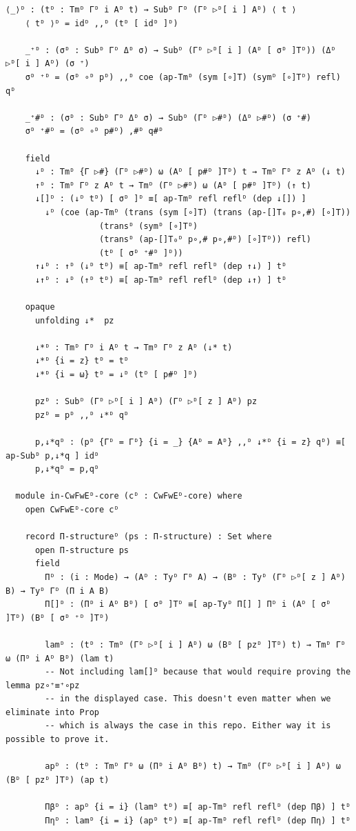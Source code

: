 {\begin{Verbatim}[breaklines=true,breakanywhere=true,fontsize=\scriptsize]
    ⟨_⟩ᴰ : (tᴰ : Tmᴰ Γᴰ i Aᴰ t) → Subᴰ Γᴰ (Γᴰ ▷ᴰ[ i ] Aᴰ) ⟨ t ⟩
    ⟨ tᴰ ⟩ᴰ = idᴰ ,,ᴰ (tᴰ [ idᴰ ]ᴰ)

    _⁺ᴰ : (σᴰ : Subᴰ Γᴰ Δᴰ σ) → Subᴰ (Γᴰ ▷ᴰ[ i ] (Aᴰ [ σᴰ ]Tᴰ)) (Δᴰ ▷ᴰ[ i ] Aᴰ) (σ ⁺)
    σᴰ ⁺ᴰ = (σᴰ ∘ᴰ pᴰ) ,,ᴰ coe (ap-Tmᴰ (sym [∘]T) (symᴰ [∘]Tᴰ) refl) qᴰ

    _⁺#ᴰ : (σᴰ : Subᴰ Γᴰ Δᴰ σ) → Subᴰ (Γᴰ ▷#ᴰ) (Δᴰ ▷#ᴰ) (σ ⁺#)
    σᴰ ⁺#ᴰ = (σᴰ ∘ᴰ p#ᴰ) ,#ᴰ q#ᴰ

    field
      ↓ᴰ : Tmᴰ {Γ ▷#} (Γᴰ ▷#ᴰ) ω (Aᴰ [ p#ᴰ ]Tᴰ) t → Tmᴰ Γᴰ z Aᴰ (↓ t)
      ↑ᴰ : Tmᴰ Γᴰ z Aᴰ t → Tmᴰ (Γᴰ ▷#ᴰ) ω (Aᴰ [ p#ᴰ ]Tᴰ) (↑ t)
      ↓[]ᴰ : (↓ᴰ tᴰ) [ σᴰ ]ᴰ ≡[ ap-Tmᴰ refl reflᴰ (dep ↓[]) ]
        ↓ᴰ (coe (ap-Tmᴰ (trans (sym [∘]T) (trans (ap-[]T₀ p∘,#) [∘]T))
                   (transᴰ (symᴰ [∘]Tᴰ)
                   (transᴰ (ap-[]T₀ᴰ p∘,# p∘,#ᴰ) [∘]Tᴰ)) refl)
                   (tᴰ [ σᴰ ⁺#ᴰ ]ᴰ))
      ↑↓ᴰ : ↑ᴰ (↓ᴰ tᴰ) ≡[ ap-Tmᴰ refl reflᴰ (dep ↑↓) ] tᴰ
      ↓↑ᴰ : ↓ᴰ (↑ᴰ tᴰ) ≡[ ap-Tmᴰ refl reflᴰ (dep ↓↑) ] tᴰ

    opaque
      unfolding ↓*  pz

      ↓*ᴰ : Tmᴰ Γᴰ i Aᴰ t → Tmᴰ Γᴰ z Aᴰ (↓* t)
      ↓*ᴰ {i = z} tᴰ = tᴰ
      ↓*ᴰ {i = ω} tᴰ = ↓ᴰ (tᴰ [ p#ᴰ ]ᴰ)

      pzᴰ : Subᴰ (Γᴰ ▷ᴰ[ i ] Aᴰ) (Γᴰ ▷ᴰ[ z ] Aᴰ) pz
      pzᴰ = pᴰ ,,ᴰ ↓*ᴰ qᴰ

      p,↓*qᴰ : (pᴰ {Γᴰ = Γᴰ} {i = _} {Aᴰ = Aᴰ} ,,ᴰ ↓*ᴰ {i = z} qᴰ) ≡[ ap-Subᴰ p,↓*q ] idᴰ
      p,↓*qᴰ = p,qᴰ

  module in-CwFwEᴰ-core (cᴰ : CwFwEᴰ-core) where
    open CwFwEᴰ-core cᴰ

    record Π-structureᴰ (ps : Π-structure) : Set where
      open Π-structure ps
      field
        Πᴰ : (i : Mode) → (Aᴰ : Tyᴰ Γᴰ A) → (Bᴰ : Tyᴰ (Γᴰ ▷ᴰ[ z ] Aᴰ) B) → Tyᴰ Γᴰ (Π i A B)
        Π[]ᴰ : (Πᴰ i Aᴰ Bᴰ) [ σᴰ ]Tᴰ ≡[ ap-Tyᴰ Π[] ] Πᴰ i (Aᴰ [ σᴰ ]Tᴰ) (Bᴰ [ σᴰ ⁺ᴰ ]Tᴰ)

        lamᴰ : (tᴰ : Tmᴰ (Γᴰ ▷ᴰ[ i ] Aᴰ) ω (Bᴰ [ pzᴰ ]Tᴰ) t) → Tmᴰ Γᴰ ω (Πᴰ i Aᴰ Bᴰ) (lam t)
        -- Not including lam[]ᴰ because that would require proving the lemma pz∘⁺≡⁺∘pz
        -- in the displayed case. This doesn't even matter when we eliminate into Prop
        -- which is always the case in this repo. Either way it is possible to prove it.

        apᴰ : (tᴰ : Tmᴰ Γᴰ ω (Πᴰ i Aᴰ Bᴰ) t) → Tmᴰ (Γᴰ ▷ᴰ[ i ] Aᴰ) ω (Bᴰ [ pzᴰ ]Tᴰ) (ap t)

        Πβᴰ : apᴰ {i = i} (lamᴰ tᴰ) ≡[ ap-Tmᴰ refl reflᴰ (dep Πβ) ] tᴰ
        Πηᴰ : lamᴰ {i = i} (apᴰ tᴰ) ≡[ ap-Tmᴰ refl reflᴰ (dep Πη) ] tᴰ


\end{Verbatim}}
